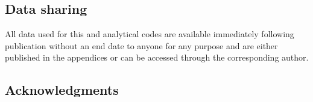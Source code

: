 \documentclass [11pt]{article}
\theoremstyle{plain}
\theoremstyle{definition}
\theoremstyle{remark}
\newcommand{\1}{\bm{1}}
\begin{document}
\subsection*{Data sharing}  
All data used for this and analytical codes are available immediately following publication without an end date to anyone for any purpose and are either published in the appendices or can be accessed through the corresponding author.

\subsection*{Acknowledgments}  

\clearpage 





\clearpage   
\renewcommand\thefigure{\thesection.\arabic{figure}}   
\renewcommand\thetable{\thesection.\arabic{table}}   
\end{document}
